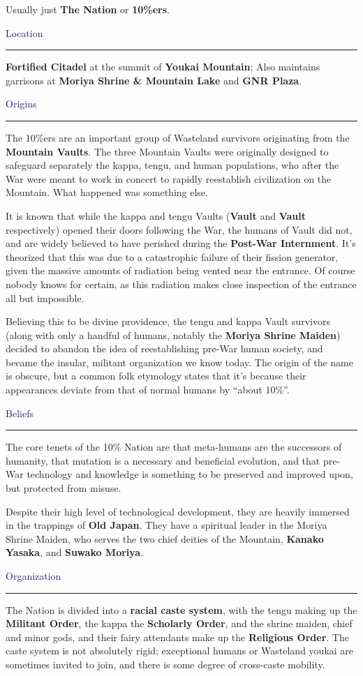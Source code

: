 \documentclass[a4paper,12pt]{book}
\newcommand{\maru}[1]{\raisebox{.5pt}{\textcircled{\raisebox{-.9pt} {#1}}}}
\newcommand{\factionheading}[1]{
\parbox{\textwidth}{
        \vspace{2mm}
        \noindent
        \textcolor{MidnightBlue}{
{\large {#1}
        \vspace*{1mm}
        \hrule}
        \vspace*{3mm}
        \noindent
} } }
\begin{document}
Usually just \textbf{The Nation} or \textbf{10\%ers}.

\factionheading{Location}
\textbf{Fortified Citadel} at the summit of \textbf{Youkai Mountain}; Also maintains garrisons at \textbf{Moriya Shrine \& Mountain Lake} and \textbf{GNR Plaza}.

\factionheading{Origins}
The 10\%ers are an important group of Wasteland survivors originating from the \textbf{Mountain Vaults}. The three Mountain Vaults were originally designed to safeguard separately the kappa, tengu, and human populations, who after the War were meant to work in concert to rapidly reestablish civilization on the Mountain. What happened was something else.

It is known that while the kappa and tengu Vaults (\textbf{Vault \maru{11}} and \textbf{Vault \maru{12}} respectively) opened their doors following the War, the humans of {Vault \maru{13}} did not, and are widely believed to have perished during the \textbf{Post-War Internment}. It's theorized that this was due to a catastrophic failure of their fission generator, given the massive amounts of radiation being vented near the entrance. Of course nobody knows for certain, as this radiation makes close inspection of the entrance all but impossible.

Believing this to be divine providence, the tengu and kappa Vault survivors (along with only a handful of humans, notably the \textbf{Moriya Shrine Maiden}) decided to abandon the idea of reestablishing pre-War human society, and became the insular, militant organization we know today. The origin of the name is obscure, but a common folk etymology states that it's because their appearances deviate from that of normal humans by ``about 10\%''.

\factionheading{Beliefs}
The core tenets of the 10\% Nation are that meta-humans are the successors of humanity, that mutation is a necessary and beneficial evolution, and that pre-War technology and knowledge is something to be preserved and improved upon, but protected from misuse.

Despite their high level of technological development, they are heavily immersed in the trappings of \textbf{Old Japan}. They have a spiritual leader in the Moriya Shrine Maiden, who serves the two chief deities of the Mountain, \textbf{Kanako Yasaka}, and \textbf{Suwako Moriya}.

\factionheading{Organization}
The Nation is divided into a \textbf{racial caste system}, with the tengu making up the \textbf{Militant Order}, the kappa the \textbf{Scholarly Order}, and the shrine maiden, chief and minor gods, and their fairy attendants make up the \textbf{Religious Order}. The caste system is not absolutely rigid; exceptional humans or Wasteland youkai are sometimes invited to join, and there is some degree of cross-caste mobility.
\end{document}

